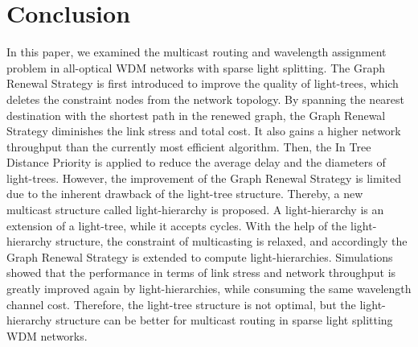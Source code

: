 \documentclass[conference]{IEEEtran}
\begin{document}
\section{Conclusion}
\label{sec: Conclusion}
In this paper, we examined the multicast routing and wavelength assignment problem in all-optical WDM networks with sparse light splitting. The Graph Renewal Strategy is first introduced to improve the quality of light-trees, which deletes the constraint nodes from the network topology. By spanning the nearest destination with the shortest path in the renewed graph, the Graph Renewal Strategy diminishes the link stress and total cost. It also gains a higher network throughput than the currently most efficient algorithm. Then, the In Tree Distance Priority is applied to reduce the average delay and the diameters of light-trees. However, the improvement of the Graph Renewal Strategy is limited due to the inherent drawback of the light-tree structure. Thereby, a new multicast structure called light-hierarchy is proposed.
A light-hierarchy is an extension of a light-tree, while it accepts cycles. With the help of the light-hierarchy structure, the constraint of multicasting is relaxed, and accordingly the Graph Renewal Strategy is extended to compute light-hierarchies. Simulations showed that the performance in terms of link stress and network throughput is greatly improved again by light-hierarchies, while consuming the same wavelength channel cost. Therefore, the light-tree structure is not optimal, but the light-hierarchy structure can be better for multicast routing in sparse light splitting WDM networks.
\end{document}
